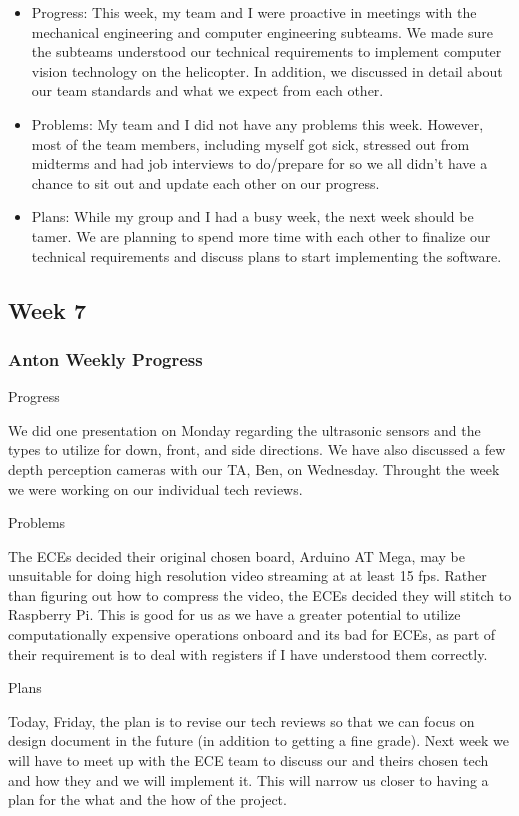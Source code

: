 \documentclass[onecolumn, oneside, letterpaper, draftclsnofoot, 10pt, compsoc]{IEEEtran}
\begin{document}
\begin{itemize}
    \item Progress: This week, my team and I were proactive in meetings with the mechanical engineering and computer engineering subteams. We made sure the subteams understood our technical requirements to implement computer vision technology on the helicopter. In addition, we discussed in detail about our team standards and what we expect from each other.
    \item Problems: My team and I did not have any problems this week. However, most of the team members, including myself got sick, stressed out from midterms and had job interviews to do/prepare for so we all didn't have a chance to sit out and update each other on our progress.
    \item Plans: While my group and I had a busy week, the next week should be tamer. We are planning to spend more time with each other to finalize our technical requirements and discuss plans to start implementing the software.
\end{itemize}


\subsection{Week 7}

\subsubsection{Anton Weekly Progress}
Progress

We did one presentation on Monday regarding the ultrasonic sensors and the types to utilize for down, front, and side directions. We have also discussed a few depth perception cameras with our TA, Ben, on Wednesday. Throught the week we were working on our individual tech reviews.

Problems

The ECEs decided their original chosen board, Arduino AT Mega, may be unsuitable for doing high resolution video streaming at at least 15 fps. Rather than figuring out how to compress the video, the ECEs decided they will stitch to Raspberry Pi. This is good for us as we have a greater potential to utilize computationally expensive operations onboard and its bad for ECEs, as part of their requirement is to deal with registers if I have understood them correctly.

Plans

Today, Friday, the plan is to revise our tech reviews so that we can focus on design document in the future (in addition to getting a fine grade). Next week we will have to meet up with the ECE team to discuss our and theirs chosen tech and how they and we will implement it. This will narrow us closer to having a plan for the what and the how of the project.
\end{document}

